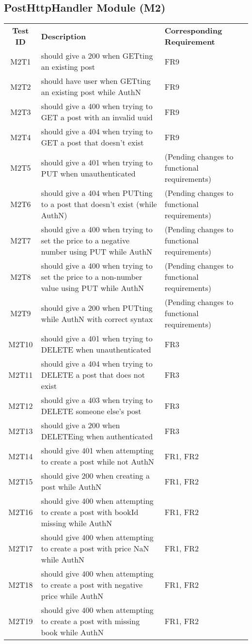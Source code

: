 \documentclass[fullpage]{article}
\begin{document}
\subsection{PostHttpHandler Module (M2)}
\begin{table}[H]
\flushleft
\begin{tabular}{|c|p{8.5cm}|p{5cm}|}
\hline
 \rowcolor{lightgray}
\textbf{Test ID} &\textbf{Description} &\textbf{Corresponding Requirement}\\
M2T1 & should give a 200 when GETting an existing post & FR9 \\
\hline
M2T2 & should have user when GETting an existing post while AuthN & FR9 \\
\hline
M2T3 & should give a 400 when trying to GET a post with an invalid uuid & FR9 \\
\hline
M2T4 & should give a 404 when trying to GET a post that doesn't exist & FR9 \\
\hline
M2T5 & should give a 401 when trying to PUT when unauthenticated & (Pending changes to functional requirements) \\
\hline
M2T6 & should give a 404 when PUTting to a post that doesn't exist (while AuthN) & (Pending changes to functional requirements) \\
\hline
M2T7 & should give a 400 when trying to set the price to a negative number using PUT while AuthN & (Pending changes to functional requirements) \\
\hline
M2T8 & should give a 400 when trying to set the price to a non-number value using PUT while AuthN & (Pending changes to functional requirements) \\
\hline
M2T9 & should give a 200 when PUTting while AuthN with correct syntax & (Pending changes to functional requirements) \\
\hline
M2T10 & should give a 401 when trying to DELETE when unauthenticated & FR3 \\
\hline
M2T11 & should give a 404 when trying to DELETE a post that does not exist & FR3 \\
\hline
M2T12 & should give a 403 when trying to DELETE someone else's post & FR3 \\
\hline
M2T13 & should give a 200 when DELETEing when authenticated & FR3 \\
\hline
M2T14 & should give 401 when attempting to create a post while not AuthN & FR1, FR2 \\
\hline
M2T15 & should give 200 when creating a post while AuthN & FR1, FR2 \\
\hline
M2T16 & should give 400 when attempting to create a post with bookId missing while AuthN & FR1, FR2 \\
\hline
M2T17 & should give 400 when attempting to create a post with price NaN while AuthN & FR1, FR2 \\
\hline
M2T18 & should give 400 when attempting to create a post with negative price while AuthN & FR1, FR2 \\
\hline
M2T19 & should give 400 when attempting to create a post with missing book while AuthN & FR1, FR2 \\
\hline



\end{tabular}
\end{table}
\end{document}

